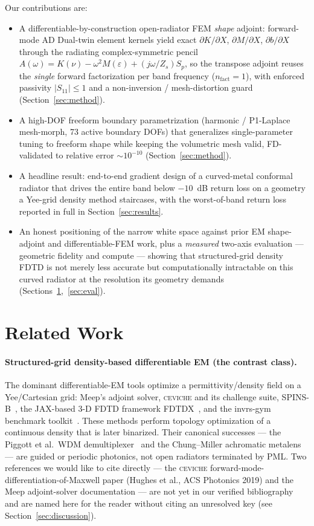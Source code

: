 \documentclass{anvil-paper}
\begin{document}
Our contributions are:
\begin{itemize}
  \item A differentiable-by-construction open-radiator FEM \emph{shape} adjoint:
  forward-mode AD Dual-twin element kernels yield exact
  $\partial K/\partial X$, $\partial M/\partial X$, $\partial b/\partial X$
  through the radiating complex-symmetric pencil
  $A(\omega)=K(\nu)-\omega^2 M(\varepsilon)+(j\omega/Z_s)S_p$, so the transpose
  adjoint reuses the \emph{single} forward factorization per band frequency
  ($n_{\text{fact}}=1$), with enforced passivity $|S_{11}|\le 1$ and a
  non-inversion / mesh-distortion guard (Section~\ref{sec:method}).
  \item A high-DOF freeform boundary parametrization (harmonic / P1-Laplace
  mesh-morph, 73 active boundary DOFs) that generalizes single-parameter tuning
  to freeform shape while keeping the volumetric mesh valid, FD-validated to
  relative error $\sim\!10^{-10}$ (Section~\ref{sec:method}).
  \item A headline result: end-to-end gradient design of a curved-metal
  conformal radiator that drives the entire band below $-10$~dB return loss on a
  geometry a Yee-grid density method staircases, with the worst-of-band return
  loss reported in full in Section~\ref{sec:results}.
  \item An honest positioning of the narrow white space against prior EM
  shape-adjoint and differentiable-FEM work, plus a \emph{measured} two-axis
  evaluation --- geometric fidelity and compute --- showing that structured-grid
  density FDTD is not merely less accurate but computationally intractable on
  this curved radiator at the resolution its geometry demands
  (Sections~\ref{sec:related},~\ref{sec:eval}).
\end{itemize}

\section{Related Work}
\label{sec:related}

\paragraph{Structured-grid density-based differentiable EM (the contrast class).}
The dominant differentiable-EM tools optimize a permittivity/density field on a
Yee/Cartesian grid: Meep's adjoint solver, \textsc{ceviche} and its
challenge suite, SPINS-B~\cite{su_spinsb}, the JAX-based 3-D FDTD framework
FDTDX~\cite{fdtdx}, and the invrs-gym benchmark toolkit~\cite{invrsgym}. These
methods perform topology optimization of a continuous density that is later
binarized. Their canonical successes --- the Piggott et al.\ WDM
demultiplexer~\cite{piggott2015} and the Chung--Miller achromatic
metalens~\cite{chung2020} --- are guided or periodic photonics, not open
radiators terminated by PML. Two references we would like to cite directly ---
the \textsc{ceviche} forward-mode-differentiation-of-Maxwell paper (Hughes et
al., ACS Photonics 2019) and the Meep adjoint-solver documentation --- are not
yet in our verified bibliography and are named here for the reader without citing
an unresolved key (see Section~\ref{sec:discussion}).
\end{document}
